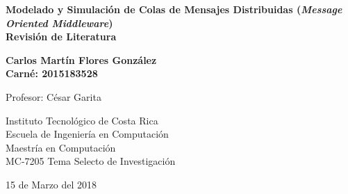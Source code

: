 \documentclass[11pt, twoside]{report}
\begin{document}
  
 


\begin{titlepage}
    \begin{center}
        \vspace*{1cm}
        
        \Large
        \textbf{Modelado y Simulación de Colas de Mensajes Distribuidas (\emph{Message Oriented Middleware})\\ Revisión de Literatura}
        
        \vspace{1.5cm}
        
        \textbf{Carlos Martín Flores González\\ \textnormal{\small{Carné: 2015183528}}}
        
        \vfill
        
        Profesor: César Garita
        
        
        
        \Large
        Instituto Tecnológico de Costa Rica\\
        Escuela de Ingeniería en Computación\\
        Maestría en Computación\\
        MC-7205 Tema Selecto de Investigación
        
        \vfill
        
        15 de Marzo del 2018
        
        
        
    \end{center}
\end{titlepage}





\setcounter{page}{1}
\tableofcontents
\clearpage

%







\end{document}
